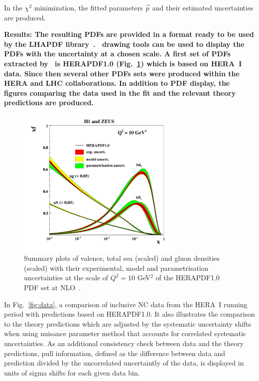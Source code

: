 \begin{description}
%
In the $\chi^2$ minimization,
the fitted parameters $\vec{p}$ and their estimated uncertainties are produced. 
%
\item
\bf{Results:} \rm 
The resulting PDFs are provided in a format ready to be used by the LHAPDF 
library~\cite{lhapdf,lhapdfweb}.
\fitter\ drawing tools can be used to display the PDFs with the uncertainty at a chosen scale.  
A first set of PDFs extracted by \fitter~is HERAPDF1.0 \cite{h1zeus:2009wt} (Fig.~\ref{fig:hera1}) 
which is based on HERA~I data.
Since then several other PDFs sets were produced within the HERA and LHC collaborations.
In addition to PDF display, 
the figures comparing the data used in the fit and the relevant theory predictions are produced. 
\begin{figure}[!ht]
   \centering
   \includegraphics[width=8cm]{hera1.pdf}
   \caption{Summary plots of valence, total sea (scaled) and gluon densities (scaled) with their experimental, model and parametrisation uncertainties at the scale of $Q^2=10$ GeV$^2$ of the HERAPDF1.0 PDF set at NLO~\cite{h1zeus:2009wt}.}
 \label{fig:hera1}
\end{figure}
In Fig.~\ref{fig:data}, a comparison of inclusive NC data from the HERA~I running period with predictions based on HERAPDF1.0. It also illustrates the comparison to the theory predictions which are adjusted by the  
systematic uncertainty shifts when using nuisance parameter method that accounts for 
correlated systematic uncertainties. 
As an additional consistency check between data and the theory predictions, pull information, defined as the difference between data and prediction divided by the uncorrelated uncertaintly of the data, is displayed in units of sigma shifts for each given data bin.


\end{description}
